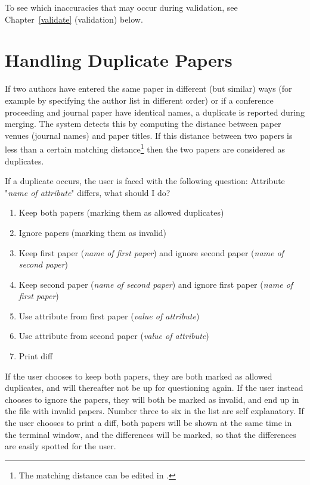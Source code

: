 To see which inaccuracies that may occur during validation, see
Chapter~\ref{validate} (validation) below.

\section{Handling Duplicate Papers}

If two authors have entered the same paper in different (but similar)
ways (for example by specifying the author list in different order) or
if a conference proceeding and journal paper have identical names, a
duplicate is reported during merging. The system detects this by
computing the distance between paper venues (journal names) and paper
titles. If this distance between two papers is less than a certain
matching distance\footnote{The matching distance
 can be edited in
.} then the two papers are considered
as duplicates.

If a duplicate occurs, the user is faced with the following question:
Attribute "\emph{name of attribute}" differs, what should I do?
\begin{enumerate}
\item
  Keep both papers (marking them as allowed duplicates)
\item
  Ignore papers (marking them as invalid)
\item
  Keep first paper (\emph{name of first paper}) and ignore second paper (\emph{name of second paper})
\item
  Keep second paper (\emph{name of second paper}) and ignore first paper (\emph{name of first paper})
\item
  Use attribute from first paper (\emph{value of attribute})
\item
  Use attribute from second paper (\emph{value of attribute})
\item
  Print diff 
\end{enumerate}

If the user chooses to keep both papers, they are both marked as
allowed duplicates, and will thereafter not be up for questioning
again.  If the user instead chooses to ignore the papers, they will
both be marked as invalid, and end up in the file with invalid papers.
Number three to six in the list are self explanatory. If the user
chooses to print a diff, both papers will be shown at the same time
in the terminal window, and the differences will be marked, so that
the differences are easily spotted for the user.

